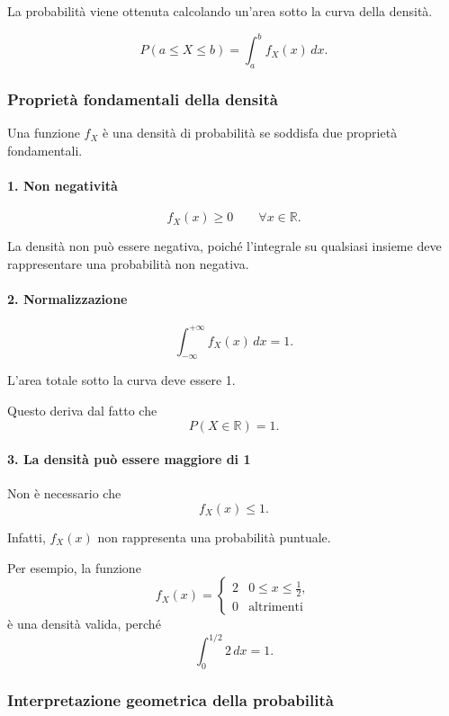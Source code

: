 La probabilità viene ottenuta
calcolando un'area sotto la curva della densità.

\[
\boxed{
P(a\leq X\leq b)
=
\int_a^b f_X(x)\,dx.
}
\]

\subsubsection{Proprietà fondamentali della densità}

Una funzione $f_X$ è una densità di probabilità
se soddisfa due proprietà fondamentali.

\paragraph{1. Non negatività}

\[
\boxed{
f_X(x)\geq 0
\qquad \forall x\in\mathbb{R}.
}
\]

La densità non può essere negativa,
poiché l'integrale su qualsiasi insieme
deve rappresentare una probabilità
non negativa.

\paragraph{2. Normalizzazione}

\[
\boxed{
\int_{-\infty}^{+\infty}
f_X(x)\,dx=1.
}
\]

L'area totale sotto la curva deve essere 1.

Questo deriva dal fatto che
\[
P(X\in\mathbb{R})=1.
\]

\paragraph{3. La densità può essere maggiore di 1}

Non è necessario che
\[
f_X(x)\leq 1.
\]

Infatti, $f_X(x)$ non rappresenta
una probabilità puntuale.

Per esempio, la funzione
\[
f_X(x)=
\begin{cases}
2 & 0\leq x\leq \frac12,\\
0 & \text{altrimenti}
\end{cases}
\]
è una densità valida, perché
\[
\int_0^{1/2}2\,dx=1.
\]

\subsubsection{Interpretazione geometrica della probabilità}

